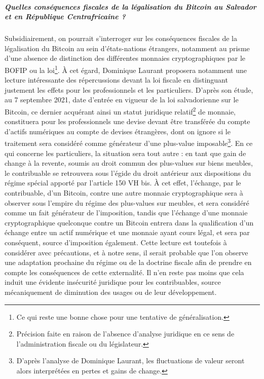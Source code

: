 {\subparagraph{Quelles conséquences fiscales de la légalisation du Bitcoin au Salvador et en République Centrafricaine ?}

Subsidiairement, on pourrait s'interroger sur les conséquences fiscales de la légalisation du Bitcoin au sein d'états-nations étrangers, notamment au prisme d'une absence de distinction des différentes monnaies cryptographiques par le BOFIP ou la loi\footnote{Ce qui reste une bonne chose pour une tentative de généralisation.}. À cet égard, Dominique Laurant proposera notamment une lecture intéressante des répercussions devant la loi fiscale en distinguant justement les effets pour les professionnels et les particuliers. D'après son étude, au 7 septembre 2021, date d'entrée en vigueur de la loi salvadorienne sur le Bitcoin, ce dernier acquérant ainsi un statut juridique relatif\footnote{Précision faite en raison de l'absence d'analyse juridique en ce sens de l'administration fiscale ou du législateur.} de monnaie, constituera pour les professionnels une devise devant être transférée du compte d'actifs numériques au compte de devises étrangères, dont on ignore si le traitement sera considéré comme générateur d'une plus-value imposable\footnote{D'après l'analyse de Dominique Laurant, les fluctuations de valeur seront alors interprétées en pertes et gains de change.}. En ce qui concerne les particuliers, la situation sera tout autre : en tant que gain de change à la revente, soumis au droit commun des plus-values sur biens meubles, le contribuable se retrouvera sous l'égide du droit antérieur aux dispositions du régime spécial apporté par l'article 150 VH bis. À cet effet, l'échange, par le contribuable, d'un Bitcoin, contre une autre monnaie cryptographique sera à observer sous l'empire du régime des plus-values sur meubles, et sera considéré comme un fait générateur de l'imposition, tandis que l'échange d'une monnaie cryptographique quelconque contre un Bitcoin entrera dans la qualification d'un échange entre un actif numérique et une monnaie ayant cours légal, et sera par conséquent, source d'imposition également. Cette lecture est toutefois à considérer avec précautions, et à notre sens, il serait probable que l'on observe une adaptation prochaine du régime ou de la doctrine fiscale afin de prendre en compte les conséquences de cette externalité. Il n'en reste pas moins que cela induit une évidente insécurité juridique pour les contribuables, source mécaniquement de diminution des usages ou de leur développement.\par

}
